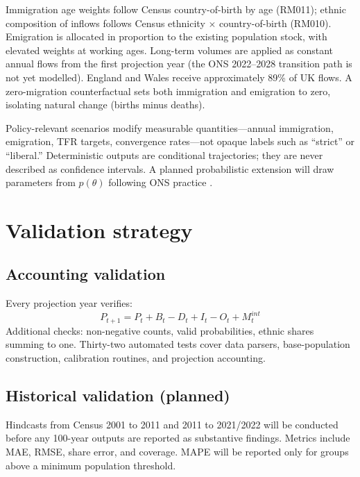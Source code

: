 \documentclass[12pt,a4paper]{article}
\begin{document}
Immigration age weights follow Census country-of-birth by age (RM011); ethnic composition of
inflows follows Census ethnicity $\times$ country-of-birth (RM010). Emigration is allocated
in proportion to the existing population stock, with elevated weights at working ages. Long-term
volumes are applied as constant annual flows from the first projection year (the ONS
2022--2028 transition path is not yet modelled). England and Wales receive approximately 89\%
of UK flows. A zero-migration counterfactual sets both immigration and emigration to zero,
isolating natural change (births minus deaths).

Policy-relevant scenarios modify measurable quantities---annual immigration, emigration, TFR
targets, convergence rates---not opaque labels such as ``strict'' or ``liberal.'' Deterministic
outputs are conditional trajectories; they are never described as confidence intervals. A
planned probabilistic extension will draw parameters from $p(\theta)$ following ONS practice
\citep{ons2024nppvariants}.

\section{Validation strategy}
\label{sec:accounting}

\subsection{Accounting validation}

Every projection year verifies:
\begin{equation}
    P_{t+1} = P_t + B_t - D_t + I_t - O_t + M^{int}_t
    \label{eq:accounting}
\end{equation}
Additional checks: non-negative counts, valid probabilities, ethnic shares summing to one.
Thirty-two automated tests cover data parsers, base-population construction, calibration
routines, and projection accounting.

\subsection{Historical validation (planned)}

Hindcasts from Census 2001 to 2011 and 2011 to 2021/2022 will be conducted before any
100-year outputs are reported as substantive findings. Metrics include MAE, RMSE, share error,
and coverage. MAPE will be reported only for groups above a minimum population threshold.
\end{document}
